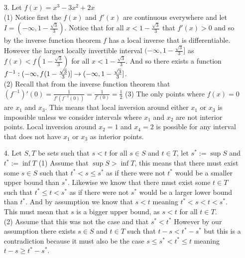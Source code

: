 \documentclass[12pt]{amsart}
\begin{document}
\begin{itemize}
     \item[3.] Let $f(x)=x^3-3x^2+2x$\\ %
     (1) Notice first the $f(x)$ and $f'(x)$ are continuous everywhere and let $I=(-\infty, 1-\frac{\sqrt{3}}{3})$. Notice that for all $x<1-\frac{\sqrt{3}}{3}$ that $f'(x)>0$ and so 
     by the inverse function theorem $f$ has a local inverse that is differentiable. However the largest locally invertible interval $(-\infty, 1-\frac{\sqrt{3}}{3}]$ 
     as $f(x)<f(1-\frac{\sqrt{3}}{3})$ for all $x<1-\frac{\sqrt{3}}{3}$. And so there exists a function $f^{-1}:(-\infty,f(1-\frac{\sqrt{3}}{3})]\rightarrow(-\infty,1-\frac{\sqrt{3}}{3}]$.\\
     (2) Recall that from the inverse function theorem that $(f^{-1})'(0)=\frac{1}{f'(f^{-1}(0))}=\frac{1}{f'(0)}=\frac{1}{2}$
     (3) The only points where $f(x)=0$ are $x_1$ and $x_3$. This means that local inversion around either $x_1$ or $x_3$ is impossible unless we consider intervals where
     $x_1$ and $x_2$ are not interior points. Local inversion around $x_2=1$ and $x_4=2$ is possible for any interval that does not have $x_1$ or $x_3$ as interior points.

     \item[4.] Let $S,T$ be sets such that $s<t$ for all $s\in S$ and $t\in T$, let $s^*:=\sup S$ and $t^*:=\inf T$
     (1) Assume that $\sup S> \inf T$, this means that there must exist some $s\in S$ such that $t^*<s\leq s^*$ as if there were not $t^*$ would be a 
     smaller upper bound than $s^*$. Likewise we know that there must exist some $t\in T$ such that $t^*\leq t< s^*$ as if there were not $s^*$ would be a 
     larger lower bound than $t^*$. And by assumption we know that $s<t$ meaning $t^*<s<t<s^*$. This must mean that $s$ is a bigger upper bound, as $s<t$ for all $t\in T$.\\
     (2) Assume that this was not the case and that $s^*<t^*$ However by our assumption there exists $s\in S$ and $t\in T$ such that $t-s<t^*-s^*$ but this is a 
     contradiction because it must also be the case $s\leq s^*<t^*\leq t$ meaning $t-s\geq t^*-s^*$.


\end{itemize}
\end{document}
